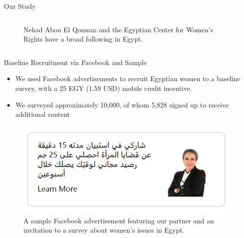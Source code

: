\documentclass[10pt]{beamer}
\begin{document}
\begin{frame}{Our Study}
\begin{columns}[T]
\begin{column}{0.5\textwidth}
\begin{figure}
\caption{\scriptsizeptsize Nehad Abou El Qomsan and the Egyptian Center for Women's Rights have a broad following in Egypt.} \end{figure} 
\end{column}
\end{columns}
\end{frame}

\begin{frame}{Baseline Recruitment via Facebook and Sample}
\begin{itemize}
    \item We used Facebook advertisements to recruit Egyptian women to a baseline survey, with a 25 EGY (1.59 USD) mobile credit incentive.
    \item We surveyed approximately 10,000, of whom 5,828 signed up to receive additional content
\end{itemize}
\begin{figure}
\includegraphics[height = 0.4\textwidth]{Recruit_Intervention/FB_ad_example.png}\captionsetup{font=small, width = 0.9\linewidth}
\caption{\scriptsizeptsize A sample Facebook advertisement featuring our partner and an invitation to a survey about women's issues in Egypt.} \end{figure} 
\end{frame}

\end{document}

